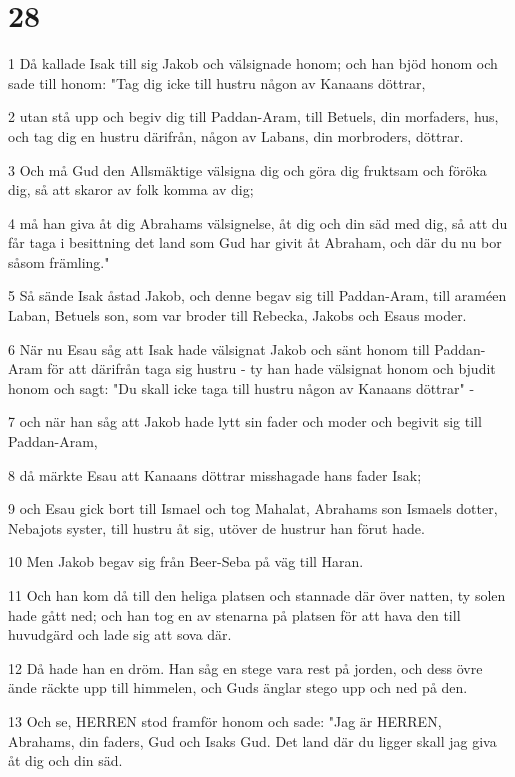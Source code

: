 \chapter{28}

\par 1 Då kallade Isak till sig Jakob och välsignade honom; och han bjöd honom och sade till honom: "Tag dig icke till hustru någon av Kanaans döttrar,
\par 2 utan stå upp och begiv dig till Paddan-Aram, till Betuels, din morfaders, hus, och tag dig en hustru därifrån, någon av Labans, din morbroders, döttrar.
\par 3 Och må Gud den Allsmäktige välsigna dig och göra dig fruktsam och föröka dig, så att skaror av folk komma av dig;
\par 4 må han giva åt dig Abrahams välsignelse, åt dig och din säd med dig, så att du får taga i besittning det land som Gud har givit åt Abraham, och där du nu bor såsom främling."
\par 5 Så sände Isak åstad Jakob, och denne begav sig till Paddan-Aram, till araméen Laban, Betuels son, som var broder till Rebecka, Jakobs och Esaus moder.
\par 6 När nu Esau såg att Isak hade välsignat Jakob och sänt honom till Paddan-Aram för att därifrån taga sig hustru - ty han hade välsignat honom och bjudit honom och sagt: "Du skall icke taga till hustru någon av Kanaans döttrar" -
\par 7 och när han såg att Jakob hade lytt sin fader och moder och begivit sig till Paddan-Aram,
\par 8 då märkte Esau att Kanaans döttrar misshagade hans fader Isak;
\par 9 och Esau gick bort till Ismael och tog Mahalat, Abrahams son Ismaels dotter, Nebajots syster, till hustru åt sig, utöver de hustrur han förut hade.
\par 10 Men Jakob begav sig från Beer-Seba på väg till Haran.
\par 11 Och han kom då till den heliga platsen och stannade där över natten, ty solen hade gått ned; och han tog en av stenarna på platsen för att hava den till huvudgärd och lade sig att sova där.
\par 12 Då hade han en dröm. Han såg en stege vara rest på jorden, och dess övre ände räckte upp till himmelen, och Guds änglar stego upp och ned på den.
\par 13 Och se, HERREN stod framför honom och sade: "Jag är HERREN, Abrahams, din faders, Gud och Isaks Gud. Det land där du ligger skall jag giva åt dig och din säd.
